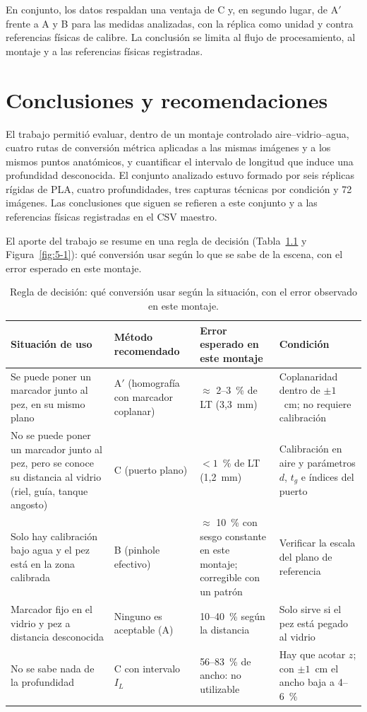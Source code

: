 \documentclass{report}
\newcommand{\Aprime}{A$'$}
\newcommand{\IL}{I_L}
\begin{document}
En conjunto, los datos respaldan una ventaja de C y, en segundo lugar, de \Aprime{} frente a A y B para las medidas analizadas, con la réplica como unidad y contra referencias físicas de calibre. La conclusión se limita al flujo de procesamiento, al montaje y a las referencias físicas registradas.

\chapter{Conclusiones y recomendaciones}
\label{cap:conclusiones}

El trabajo permitió evaluar, dentro de un montaje controlado aire--vidrio--agua, cuatro rutas de conversión métrica aplicadas a las mismas imágenes y a los mismos puntos anatómicos, y cuantificar el intervalo de longitud que induce una profundidad desconocida. El conjunto analizado estuvo formado por seis réplicas rígidas de PLA, cuatro profundidades, tres capturas técnicas por condición y 72 imágenes. Las conclusiones que siguen se refieren a este conjunto y a las referencias físicas registradas en el CSV maestro.

El aporte del trabajo se resume en una regla de decisión (Tabla~\ref{tab:regla} y Figura~\ref{fig:5-1}): qué conversión usar según lo que se sabe de la escena, con el error esperado en este montaje.

\begin{table}[htbp]

\caption{Regla de decisión: qué conversión usar según la situación, con el error observado en este montaje.}
\label{tab:regla}
\begin{tabular}{@{}X p{2.6cm} p{3.0cm} X@{}}
\hline
Situación de uso & Método recomendado & Error esperado en este montaje & Condición \\
\hline
Se puede poner un marcador junto al pez, en su mismo plano & \Aprime{} (homografía con marcador coplanar) & $\approx$ 2--3~\% de LT (3,3~mm) & Coplanaridad dentro de $\pm 1$~cm; no requiere calibración \\
No se puede poner un marcador junto al pez, pero se conoce su distancia al vidrio (riel, guía, tanque angosto) & C (puerto plano) & $< 1$~\% de LT (1,2~mm) & Calibración en aire y parámetros $d$, $t_g$ e índices del puerto \\
Solo hay calibración bajo agua y el pez está en la zona calibrada & B (pinhole efectivo) & $\approx$ 10~\% con sesgo constante en este montaje; corregible con un patrón & Verificar la escala del plano de referencia \\
Marcador fijo en el vidrio y pez a distancia desconocida & Ninguno es aceptable (A) & 10--40~\% según la distancia & Solo sirve si el pez está pegado al vidrio \\
No se sabe nada de la profundidad & C con intervalo $\IL$ & 56--83~\% de ancho: no utilizable & Hay que acotar $z$; con $\pm 1$~cm el ancho baja a 4--6~\% \\
\hline
\end{tabular}
\end{table}
\end{document}
